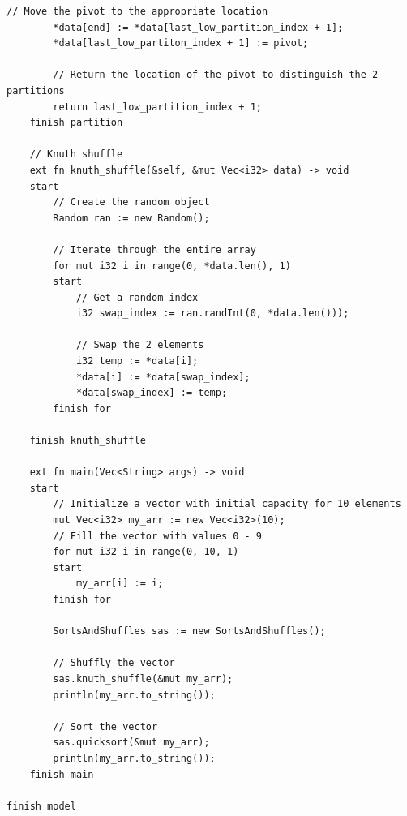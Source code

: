 \documentclass[letterpaper, 10pt, DIV=13]{scrartcl}
\numberwithin{equation}{section}
\numberwithin{figure}{section}
\numberwithin{table}{section}
\begin{document}
\begin{lstlisting}[caption = SortsAndShuffles.rez, frame = single, nolol]
        // Move the pivot to the appropriate location
        *data[end] := *data[last_low_partition_index + 1];
        *data[last_low_partiton_index + 1] := pivot;

        // Return the location of the pivot to distinguish the 2 partitions
        return last_low_partition_index + 1;
    finish partition

    // Knuth shuffle
    ext fn knuth_shuffle(&self, &mut Vec<i32> data) -> void
    start
        // Create the random object
        Random ran := new Random();

        // Iterate through the entire array
        for mut i32 i in range(0, *data.len(), 1)
        start
            // Get a random index
            i32 swap_index := ran.randInt(0, *data.len()));

            // Swap the 2 elements
            i32 temp := *data[i];
            *data[i] := *data[swap_index];
            *data[swap_index] := temp;
        finish for

    finish knuth_shuffle

    ext fn main(Vec<String> args) -> void
    start
        // Initialize a vector with initial capacity for 10 elements
        mut Vec<i32> my_arr := new Vec<i32>(10);
        // Fill the vector with values 0 - 9
        for mut i32 i in range(0, 10, 1)
        start
            my_arr[i] := i;
        finish for
        
        SortsAndShuffles sas := new SortsAndShuffles();

        // Shuffly the vector
        sas.knuth_shuffle(&mut my_arr);
        println(my_arr.to_string());

        // Sort the vector
        sas.quicksort(&mut my_arr);
        println(my_arr.to_string());
    finish main

finish model
\end{lstlisting}
\end{document}
